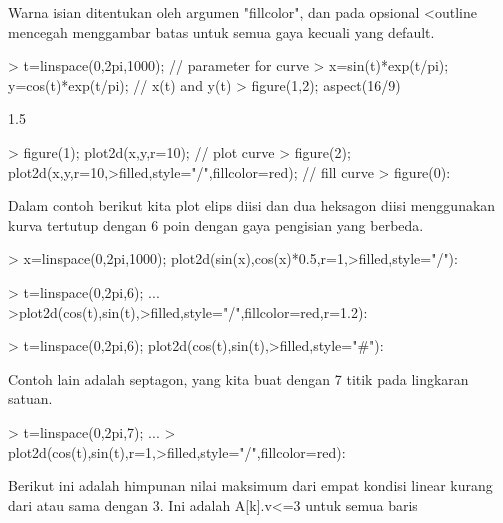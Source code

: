 \documentclass[a4paper,10pt]{article}
\begin{document}
\begin{eulernotebook}
\begin{eulercomment}
\begin{eulercomment}
\begin{eulercomment}
\begin{eulercomment}
\begin{eulercomment}
\begin{eulercomment}
\begin{eulercomment}
Warna isian ditentukan oleh argumen "fillcolor", dan pada opsional
\textless{}outline mencegah menggambar batas untuk semua gaya kecuali yang
default.
\end{eulercomment}
\begin{eulerprompt}
> t=linspace(0,2pi,1000); // parameter for curve
> x=sin(t)*exp(t/pi); y=cos(t)*exp(t/pi); // x(t) and y(t)
> figure(1,2); aspect(16/9)
\end{eulerprompt}
\begin{euleroutput}
  1.5
\end{euleroutput}
\begin{eulerprompt}
> figure(1); plot2d(x,y,r=10); // plot curve
> figure(2); plot2d(x,y,r=10,>filled,style="/",fillcolor=red); // fill curve
> figure(0):
\end{eulerprompt}
\begin{eulercomment}
Dalam contoh berikut kita plot elips diisi dan dua heksagon diisi
menggunakan kurva tertutup dengan 6 poin dengan gaya pengisian yang
berbeda.
\end{eulercomment}
\begin{eulerprompt}
> x=linspace(0,2pi,1000); plot2d(sin(x),cos(x)*0.5,r=1,>filled,style="/"):
\end{eulerprompt}
\begin{eulerprompt}
> t=linspace(0,2pi,6); ...
>plot2d(cos(t),sin(t),>filled,style="/",fillcolor=red,r=1.2):
\end{eulerprompt}
\begin{eulerprompt}
> t=linspace(0,2pi,6); plot2d(cos(t),sin(t),>filled,style="#"):
\end{eulerprompt}
\begin{eulercomment}
Contoh lain adalah septagon, yang kita buat dengan 7 titik pada
lingkaran satuan.
\end{eulercomment}
\begin{eulerprompt}
> t=linspace(0,2pi,7);  ...
> plot2d(cos(t),sin(t),r=1,>filled,style="/",fillcolor=red):
\end{eulerprompt}
\begin{eulercomment}
Berikut ini adalah himpunan nilai maksimum dari empat kondisi linear
kurang dari atau sama dengan 3. Ini adalah A[k].v\textless{}=3 untuk semua baris

\end{eulercomment}
\end{eulercomment}
\end{eulercomment}
\end{eulercomment}
\end{eulercomment}
\end{eulercomment}
\end{eulercomment}
\end{eulernotebook}
\end{document}
